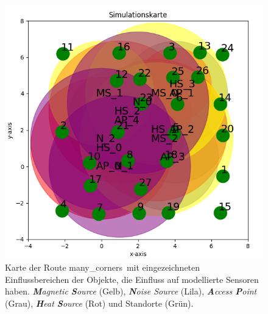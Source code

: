 \begin{figure}[h!]
    \centering
    \includegraphics[width=0.9\linewidth]{images/many_corners_simulation_map.png}
    \caption{Karte der Route \glqq many\_corners\grqq\ mit eingezeichneten Einflussbereichen der Objekte, die Einfluss auf modellierte Sensoren haben.
    \textit{\textbf{M}agnetic \textbf{S}ource} (Gelb), \textit{\textbf{N}oise Source} (Lila), \textit{\textbf{A}ccess \textbf{P}oint} (Grau),
    \textit{\textbf{H}eat \textbf{S}ource} (Rot) und Standorte (Grün).}
    \label{fig:many_corners_simulation_map}
\end{figure}